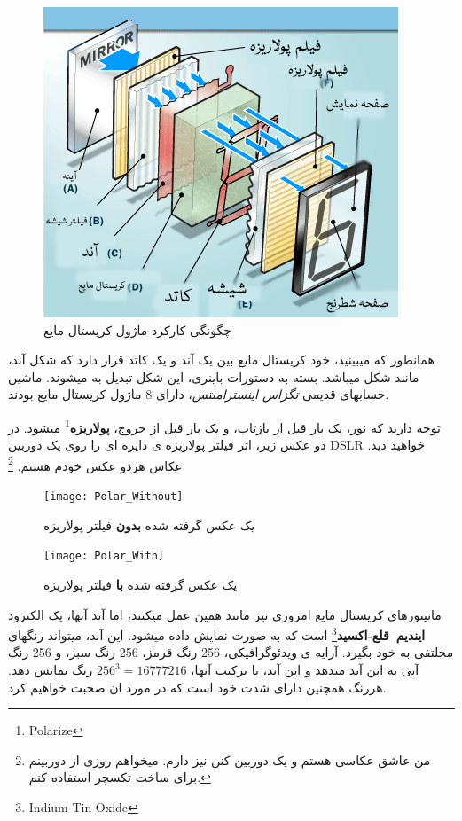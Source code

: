 \documentclass[14pt,a4paper]{memoir}
\begin{document}
	 \begin{figure}[H]
	 	\centering
	 	\includegraphics[scale=0.7]{LCD}
	 	\caption{چگونگی کارکرد ماژول کریستال مایع}
	 \end{figure}
	 
	 همانطور که میبینید، خود کریستال مایع بین یک آند و یک کاتد قرار دارد که شکل آند، مانند شکل  میباشد. بسته به دستورات باینری، این شکل تبدیل به  میشوند. ماشین حسابهای قدیمی \textit{تگزاس اینسترامنتس}، دارای 8 ماژول کریستال مایع بودند. 
	
	
	توجه دارید که نور، یک بار قبل از بازتاب، و یک بار قبل از خروج، \textbf{پولاریزه}\footnote{Polarize} میشود. در دو عکس زیر، اثر فیلتر پولاریزه ی دایره ای را روی یک دوربین DSLR خواهید دید. عکاس هردو عکس خودم هستم. \footnote{من عاشق عکاسی هستم و یک دوربین  کنن نیز دارم. میخواهم روزی از دوربینم برای ساخت تکسچر استفاده کنم.}
	
	\begin{figure}[H]
		\centering
		\texttt{[image: Polar\_Without]}
		\caption{یک عکس گرفته شده \textbf{بدون} فیلتر پولاریزه}
		\texttt{[image: Polar\_With]}
		\caption{یک عکس گرفته شده \textbf{با} فیلتر پولاریزه }
	\end{figure}



مانیتورهای کریستال مایع امروزی نیز مانند همین عمل میکنند، اما آند آنها، یک الکترود \textbf{ایندیم--قلع-اکسید}\footnote{Indium Tin Oxide} است که به صورت  نمایش داده میشود. این آند، میتواند رنگهای مخلتفی به خود بگیرد.  آرایه ی ویدئوگرافیکی، 256 رنگ قرمز، 256 رنگ سبز، و 256 رنگ آبی به این آند میدهد و این آند، با ترکیب آنها، $ 256^3 = 16777216 $ رنگ نمایش دهد. هررنگ همچنین دارای شدت خود است که در مورد ان صحبت خواهیم کرد. 
\end{document}
